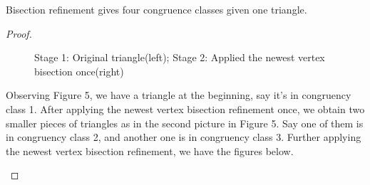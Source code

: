     \begin{lemma*}
    Bisection refinement gives four congruence classes given one triangle.
    \end{lemma*}
    \begin{proof}
    \begin{figure}[h!]
    \centering
    \caption{Stage 1: Original triangle(left); Stage 2: Applied the newest vertex bisection once(right)}
    \label{fig6: sub1}
    \end{figure}

    Observing Figure 5, we have a triangle at the beginning, say it's in congruency class 1. After applying the newest vertex bisection refinement once, we obtain two smaller pieces of triangles as in the second picture in Figure 5. Say one of them is in congruency class 2, and another one is in congruency class 3. Further applying the newest vertex bisection refinement, we have the figures below.

    \begin{figure}[h!]
    \centering
\end{figure}
\end{proof}
